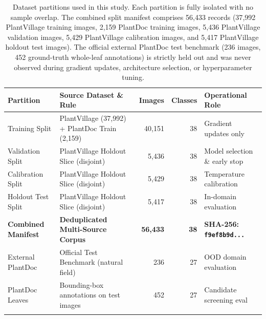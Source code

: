 \documentclass[pdflatex,sn-mathphys-num]{sn-jnl}
\theoremstyle{thmstyleone}%
\theoremstyle{thmstyletwo}%
\theoremstyle{thmstylethree}%
\begin{document}
\begin{table}[htbp]
\caption{Dataset partitions used in this study. Each partition is fully isolated with no sample overlap. The combined split manifest comprises 56{,}433 records (37{,}992 PlantVillage training images, 2{,}159 PlantDoc training images, 5{,}436 PlantVillage validation images, 5{,}429 PlantVillage calibration images, and 5{,}417 PlantVillage holdout test images). The official external PlantDoc test benchmark (236 images, 452 ground-truth whole-leaf annotations) is strictly held out and was never observed during gradient updates, architecture selection, or hyperparameter tuning.}\label{tab:dataset_partitions}%
\footnotesize
\setlength{\tabcolsep}{2.5pt}%
\begin{tabular*}{\textwidth}{@{\extracolsep\fill}>{\raggedright\arraybackslash}p{2.2cm}>{\raggedright\arraybackslash}p{3.2cm}rr>{\raggedright\arraybackslash}p{3.2cm}}
\toprule
\textbf{Partition} & \textbf{Source Dataset \& Rule} & \textbf{Images} & \textbf{Classes} & \textbf{Operational Role} \\
\midrule
Training Split & PlantVillage (37{,}992) + PlantDoc Train (2{,}159) & 40{,}151 & 38 & Gradient updates only \\
Validation Split & PlantVillage Holdout Slice (disjoint) & 5{,}436 & 38 & Model selection \& early stop \\
Calibration Split & PlantVillage Holdout Slice (disjoint) & 5{,}429 & 38 & Temperature calibration \\
Holdout Test Split & PlantVillage Holdout Slice (disjoint) & 5{,}417 & 38 & In-domain evaluation \\
\midrule
\textbf{Combined Manifest} & \textbf{Deduplicated Multi-Source Corpus} & \textbf{56{,}433} & \textbf{38} & \textbf{SHA-256: \texttt{f9ef8b9d...}} \\
\midrule
External PlantDoc & Official Test Benchmark (natural field) & 236 & 27 & OOD domain evaluation \\
PlantDoc Leaves & Bounding-box annotations on test images & 452 & 27 & Candidate screening eval \\
\botrule
\end{tabular*}
\end{table}
\end{document}
